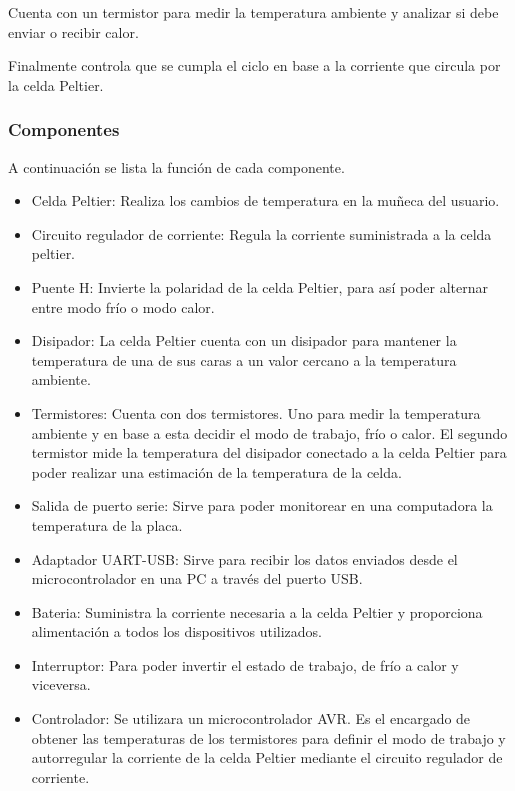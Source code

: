 \documentclass[10pt,spanish,a4paper,openany,notitlepage]{article}
\begin{document}
Cuenta con un termistor para medir la temperatura ambiente
y analizar si debe enviar o recibir calor.


Finalmente controla que se cumpla el ciclo en base a la corriente
que circula por la celda Peltier.

\subsubsection{Componentes}

A continuación se lista la función de cada componente.

\begin{itemize}
\item{Celda Peltier:} Realiza los cambios de temperatura en la muñeca del usuario.
\item{Circuito regulador de corriente:} Regula la corriente suministrada
a la celda peltier.
\item{Puente H:} Invierte la polaridad de la celda Peltier, para así poder
alternar entre modo frío o modo calor.
\item{Disipador:} La celda Peltier cuenta con un disipador para mantener
la temperatura de una de sus caras a un valor cercano a la temperatura
ambiente.
\item{Termistores:} Cuenta con dos termistores. Uno para medir la
temperatura ambiente y en base a esta decidir el modo de trabajo, frío
o calor. El segundo termistor mide la temperatura del disipador conectado
a la celda Peltier para poder realizar una estimación de la temperatura
de la celda.
\item{Salida de puerto serie:} Sirve para poder monitorear en una 
computadora la temperatura de la placa.
\item{Adaptador UART-USB:} Sirve para recibir los datos enviados desde
el microcontrolador en una PC a través del puerto USB.
\item{Bateria:} Suministra la corriente necesaria a la celda Peltier y 
 proporciona alimentación a todos los dispositivos utilizados.
\item{Interruptor:} Para poder invertir el estado de trabajo, de frío a calor 
y viceversa.
\item{Controlador:} Se utilizara un microcontrolador AVR. Es
el encargado de obtener las temperaturas de los termistores para definir
el modo de trabajo y autorregular la corriente de la celda Peltier mediante
el circuito regulador de corriente.
\end{itemize}
\end{document}
